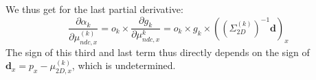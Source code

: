\begin{itemize}
We thus get for the last partial derivative: 
\begin{equation}
    \frac{\partial \alpha_{k}}{\partial \mu^{(k)}_{ndc,x}} =  o_{k} \times \frac{\partial g_{k}}{\partial \mu^{k}_{ndc,x}} = o_{k} \times g_{k} \times ((\Sigma_{2D}^{(k)})^{-1}\mathbf{d})_{x}
\end{equation}
The sign of this third and last term thus directly depends on the sign of $\mathbf{d}_{x} = p_x - \mu_{2D,x}^{(k)}$, which is undetermined. 

\end{itemize}







